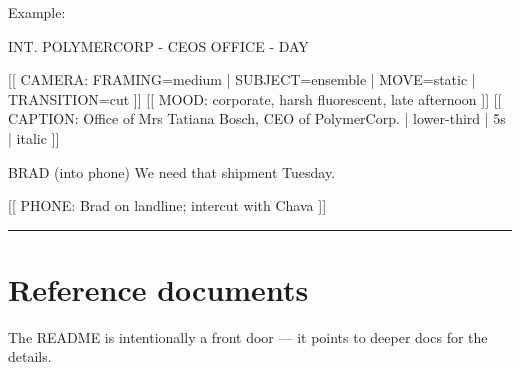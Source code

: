\documentclass[
  11pt,
]{book}
\newenvironment{Shaded}{}{}
\newcommand{\NormalTok}[1]{#1}
\begin{document}
Example:

\begin{Shaded}
\begin{Highlighting}[]
\NormalTok{INT. POLYMERCORP {-} CEO\textquotesingle{}S OFFICE {-} DAY}

\NormalTok{[[ CAMERA: FRAMING=medium | SUBJECT=ensemble | MOVE=static | TRANSITION=cut ]]}
\NormalTok{[[ MOOD: corporate, harsh fluorescent, late afternoon ]]}
\NormalTok{[[ CAPTION: Office of Mrs Tatiana Bosch, CEO of PolymerCorp. | lower{-}third | 5s | italic ]]}

\NormalTok{BRAD}
\NormalTok{(into phone)}
\NormalTok{We need that shipment Tuesday.}

\NormalTok{[[ PHONE: Brad on landline; intercut with Chava ]]}
\end{Highlighting}
\end{Shaded}

\begin{center}\rule{0.5\linewidth}{0.5pt}\end{center}

\section{Reference documents}\label{reference-documents}

The README is intentionally a front door --- it points to deeper docs
for the details.
\end{document}
